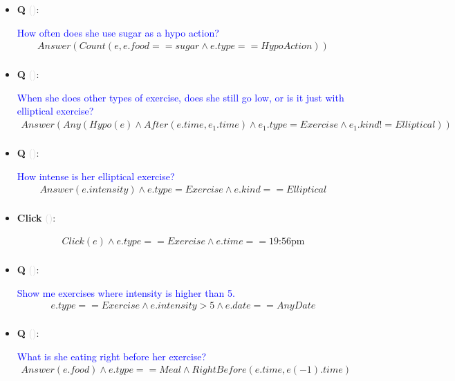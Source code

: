 \documentclass[11pt]{article}
\newcounter{CQ}
\newcounter{CClick}
\newcommand{\key}[1]{\textcolor{lightgray}{#1}}
\begin{document}
\begin{itemize}
	\item
	\textbf{Q\theCQ} \key{()}: \addtocounter{CQ}{1}
	\textcolor{blue}{ How often does she use sugar as a hypo action? }
	\begin{multline*}
	Answer(Count(e, e.food==sugar \wedge e.type==HypoAction)) \\
	\end{multline*}
	
	\item
	\textbf{Q\theCQ} \key{()}: \addtocounter{CQ}{1}
	\textcolor{blue}{ When she does other types of exercise, does she still go low, or is it just with elliptical exercise? }
	\begin{multline*}
	Answer(Any(Hypo(e) \wedge After(e.time, e_1.time) \wedge e_1.type = Exercise \wedge e_1.kind != Elliptical)) \\
	\end{multline*}
	
	\item
	\textbf{Q\theCQ} \key{()}: \addtocounter{CQ}{1}
	\textcolor{blue}{ How intense is her elliptical exercise? }
	\begin{multline*}
	Answer(e.intensity) \wedge e.type = Exercise \wedge e.kind == Elliptical \\
	\end{multline*}
	
	\item
	\textbf{Click\theCClick} \key{()}: \addtocounter{CClick}{1}
	\begin{multline*}
	Click(e) \wedge e.type == Exercise \wedge e.time == \mbox{19:56pm} \\
	\end{multline*}
	
	\item
	\textbf{Q\theCQ} \key{()}: \addtocounter{CQ}{1}
	\textcolor{blue}{ Show me exercises where intensity is higher than 5. }
	\begin{multline*}
	e.type == Exercise \wedge e.intensity > 5 \wedge e.date==AnyDate  \\
	\end{multline*}
	
	\item
	\textbf{Q\theCQ} \key{()}: \addtocounter{CQ}{1}
	\textcolor{blue}{ What is she eating right before her exercise? }
	\begin{multline*}
	Answer(e.food) \wedge e.type == Meal \wedge RightBefore(e.time, e(-1).time)  \\
	\end{multline*}
	

\end{itemize}
\end{document}
